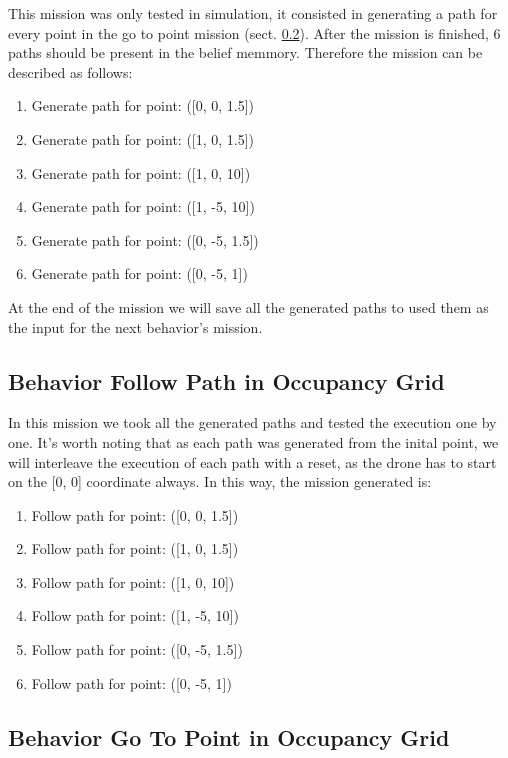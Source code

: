     This mission was only tested in simulation, it consisted in generating a path for every point in the go to point mission (sect. \ref{ch_5:subsect:behav_gtp_mission}). After the mission is finished, $6$ paths should be present in the belief memmory. Therefore the mission can be described as follows:
    
    \begin{enumerate}
      \item Generate path for point: ([0, 0, 1.5])
      \item Generate path for point: ([1, 0, 1.5])
      \item Generate path for point: ([1, 0, 10])
      \item Generate path for point: ([1, -5, 10])
      \item Generate path for point: ([0, -5, 1.5])
      \item Generate path for point: ([0, -5, 1])
    \end{enumerate}

    At the end of the mission we will save all the generated paths to used them as the input for the next behavior's mission.

  \subsection{Behavior Follow Path in Occupancy Grid} \label{ch_5:subsect:behav_fpath_mission}

    In this mission we took all the generated paths and tested the execution one by one. It's worth noting that as each path was generated from the inital point, we will interleave the execution of each path with a reset, as the drone has to start on the [0, 0] coordinate always. In this way, the mission generated is:

    \begin{enumerate}
      \item Follow path for point: ([0, 0, 1.5])
      \item Follow path for point: ([1, 0, 1.5])
      \item Follow path for point: ([1, 0, 10])
      \item Follow path for point: ([1, -5, 10])
      \item Follow path for point: ([0, -5, 1.5])
      \item Follow path for point: ([0, -5, 1])
    \end{enumerate}

  \subsection{Behavior Go To Point in Occupancy Grid} \label{ch_5:subsect:behav_gtp_mission}

